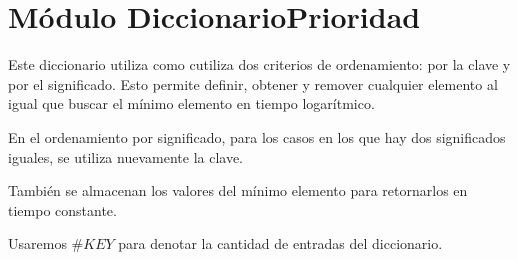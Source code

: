 \section{Módulo DiccionarioPrioridad}

Este diccionario utiliza como cutiliza dos criterios de ordenamiento: por la clave y por el significado. Esto permite definir, obtener y remover cualquier elemento al igual que buscar el mínimo elemento en tiempo logarítmico.

En el ordenamiento por significado, para los casos en los que hay dos significados iguales, se utiliza nuevamente la clave.

También se almacenan los valores del mínimo elemento para retornarlos en tiempo constante.

Usaremos $\#KEY$ para denotar la cantidad de entradas del diccionario.

